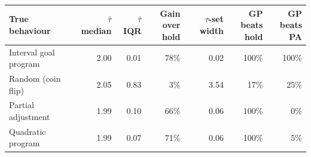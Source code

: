 \begin{tabular}{lrrrrrr}\toprule
True behaviour & \hd{$\hat\tau$\\median} & \hd{$\hat\tau$\\IQR} & \hd{Gain over\\hold} & \hd{$\tau$-set\\width} & \hd{GP beats\\hold} & \hd{GP beats\\PA}\\\midrule
Interval goal program & 2.00 & 0.01 & 78\% & 0.02 & 100\% & 100\%\\
Random (coin flip) & 2.05 & 0.83 & 3\% & 3.54 & 17\% & 25\%\\
Partial adjustment & 1.99 & 0.10 & 66\% & 0.06 & 100\% & 0\%\\
Quadratic program & 1.99 & 0.07 & 71\% & 0.06 & 100\% & 5\%\\
\bottomrule\end{tabular}